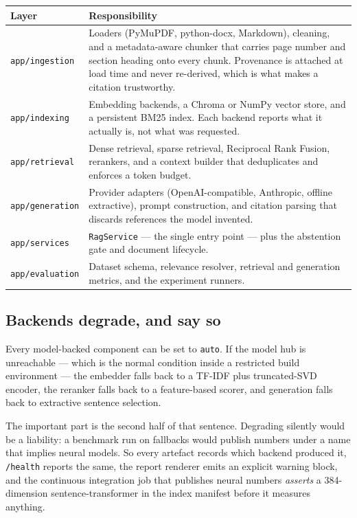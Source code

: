 \documentclass[11pt,a4paper]{article}
\newcommand{\code}[1]{\texttt{\small #1}}
\begin{document}
\begin{center}
\small
\begin{tabular}{@{}lp{10.6cm}@{}}
\toprule
\textbf{Layer} & \textbf{Responsibility} \\
\midrule
\code{app/ingestion} & Loaders (PyMuPDF, python-docx, Markdown), cleaning, and a
metadata-aware chunker that carries page number and section heading onto every
chunk. Provenance is attached at load time and never re-derived, which is what
makes a citation trustworthy. \\
\addlinespace
\code{app/indexing} & Embedding backends, a Chroma or NumPy vector store, and a
persistent BM25 index. Each backend reports what it actually is, not what was
requested. \\
\addlinespace
\code{app/retrieval} & Dense retrieval, sparse retrieval, Reciprocal Rank Fusion,
rerankers, and a context builder that deduplicates and enforces a token budget. \\
\addlinespace
\code{app/generation} & Provider adapters (OpenAI-compatible, Anthropic, offline
extractive), prompt construction, and citation parsing that discards references
the model invented. \\
\addlinespace
\code{app/services} & \code{RagService} --- the single entry point --- plus the
abstention gate and document lifecycle. \\
\addlinespace
\code{app/evaluation} & Dataset schema, relevance resolver, retrieval and
generation metrics, and the experiment runners. \\
\bottomrule
\end{tabular}
\end{center}

\subsection{Backends degrade, and say so}

Every model-backed component can be set to \code{auto}. If the model hub is
unreachable --- which is the normal condition inside a restricted build
environment --- the embedder falls back to a TF-IDF plus truncated-SVD encoder,
the reranker falls back to a feature-based scorer, and generation falls back to
extractive sentence selection.

The important part is the second half of that sentence. Degrading silently would
be a liability: a benchmark run on fallbacks would publish numbers under a name
that implies neural models. So every artefact records which backend produced it,
\code{/health} reports the same, the report renderer emits an explicit warning
block, and the continuous integration job that publishes neural numbers
\emph{asserts} a 384-dimension sentence-transformer in the index manifest before
it measures anything.
\end{document}
